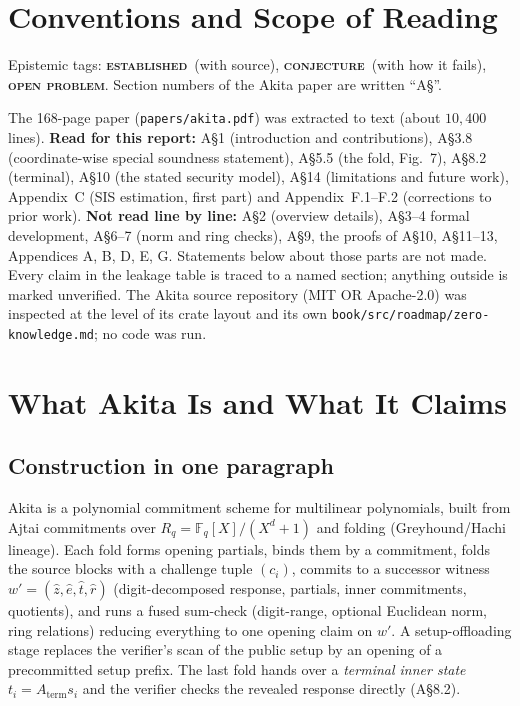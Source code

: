 \documentclass[11pt]{article}
\newcommand{\epitag}[3]{\colorbox{#2}{\textcolor{#1}{\textsc{\footnotesize\bfseries #3}}}}
\newcommand{\established}{\epitag{estgreen}{estbg}{established}}
\newcommand{\conjectureTag}{\epitag{conjyellow}{conjbg}{conjecture}}
\newcommand{\openproblem}{\epitag{openred}{openbg}{open problem}}
\renewcommand{\_}{\textunderscore\allowbreak{}}
\newcommand{\code}[1]{\texttt{\small #1}}
\theoremstyle{definition}
\begin{document}
\tableofcontents
\newpage

\section{Conventions and Scope of Reading}
Epistemic tags: \established\ (with source), \conjectureTag\ (with how it fails), \openproblem. Section numbers of the Akita paper are written ``A\S''.

\begin{findingbox}[title={What was and was not read}]
The 168-page paper (\code{papers/akita.pdf}) was extracted to text (about $10{,}400$ lines). \textbf{Read for this report:} A\S1 (introduction and contributions), A\S3.8 (coordinate-wise special soundness statement), A\S5.5 (the fold, Fig.~7), A\S8.2 (terminal), A\S10 (the stated security model), A\S14 (limitations and future work), Appendix~C (SIS estimation, first part) and Appendix~F.1--F.2 (corrections to prior work).
\textbf{Not read line by line:} A\S2 (overview details), A\S3--4 formal development, A\S6--7 (norm and ring checks), A\S9, the proofs of A\S10, A\S11--13, Appendices A, B, D, E, G. Statements below about those parts are not made. Every claim in the leakage table is traced to a named section; anything outside is marked unverified.
The Akita source repository (MIT OR Apache-2.0) was inspected at the level of its crate layout and its own \code{book/src/roadmap/zero-knowledge.md}; no code was run.
\end{findingbox}

\section{What Akita Is and What It Claims}
\subsection{Construction in one paragraph}
Akita is a polynomial commitment scheme for multilinear polynomials, built from Ajtai commitments over $R_q=\mathbb{F}_q[X]/(X^d+1)$ and folding (Greyhound/Hachi lineage). Each fold forms opening partials, binds them by a commitment, folds the source blocks with a challenge tuple $(c_i)$, commits to a successor witness $w'=(\hat z,\hat e,\hat t,\hat r)$ (digit-decomposed response, partials, inner commitments, quotients), and runs a fused sum-check (digit-range, optional Euclidean norm, ring relations) reducing everything to one opening claim on $w'$. A setup-offloading stage replaces the verifier's scan of the public setup by an opening of a precommitted setup prefix. The last fold hands over a \emph{terminal inner state} $t_i=A_{\mathrm{term}}s_i$ and the verifier checks the revealed response directly (A\S8.2).
\end{document}
